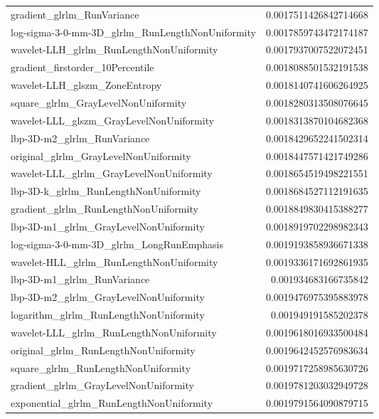 {\begin{xltabular}[H]{\textwidth}{X r}
        gradient\_glrlm\_RunVariance & 0.0017511426842714668 \\
        log-sigma-3-0-mm-3D\_glrlm\_RunLengthNonUniformity & 0.0017859743472174187 \\
        wavelet-LLH\_glrlm\_RunLengthNonUniformity & 0.0017937007522072451 \\
        gradient\_firstorder\_10Percentile & 0.0018088501532191538 \\
        wavelet-LLH\_glszm\_ZoneEntropy & 0.0018140741606264925 \\
        square\_glrlm\_GrayLevelNonUniformity & 0.0018280313508076645 \\
        wavelet-LLL\_glszm\_GrayLevelNonUniformity & 0.0018313870104682368 \\
        lbp-3D-m2\_glrlm\_RunVariance & 0.0018429652241502314 \\
        original\_glrlm\_GrayLevelNonUniformity & 0.0018447571421749286 \\
        wavelet-LLL\_glrlm\_GrayLevelNonUniformity & 0.0018654519498221551 \\
        lbp-3D-k\_glrlm\_RunLengthNonUniformity & 0.0018684527112191635 \\
        gradient\_glrlm\_RunLengthNonUniformity & 0.0018849830415388277 \\
        lbp-3D-m1\_glrlm\_GrayLevelNonUniformity & 0.0018919702298982343 \\
        log-sigma-3-0-mm-3D\_glrlm\_LongRunEmphasis & 0.0019193858936671338 \\
        wavelet-HLL\_glrlm\_RunLengthNonUniformity & 0.0019336171692861935 \\
        lbp-3D-m1\_glrlm\_RunVariance & 0.001934683166735842 \\
        lbp-3D-m2\_glrlm\_GrayLevelNonUniformity & 0.0019476975395883978 \\
        logarithm\_glrlm\_RunLengthNonUniformity & 0.001949191585202378 \\
        wavelet-LLL\_glrlm\_RunLengthNonUniformity & 0.0019618016933500484 \\
        original\_glrlm\_RunLengthNonUniformity & 0.0019642452576983634 \\
        square\_glrlm\_RunLengthNonUniformity & 0.0019717258985630726 \\
        gradient\_glrlm\_GrayLevelNonUniformity & 0.0019781203032949728 \\
        exponential\_glrlm\_RunLengthNonUniformity & 0.0019791564090879715 \\

\end{xltabular}}
